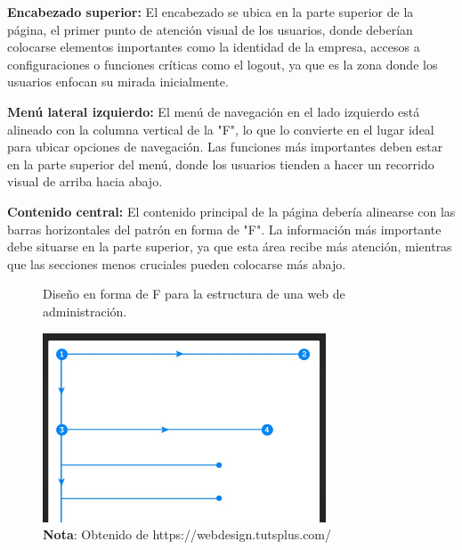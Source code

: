 		\textbf{Encabezado superior:} El encabezado se ubica en la parte superior de la página, el primer punto de atención visual de los usuarios, donde deberían colocarse elementos importantes como la identidad de la empresa, accesos a configuraciones o funciones críticas como el logout, ya que es la zona donde los usuarios enfocan su mirada inicialmente.
		
		\textbf{Menú lateral izquierdo:} El menú de navegación en el lado izquierdo está alineado con la columna vertical de la "F", lo que lo convierte en el lugar ideal para ubicar opciones de navegación. Las funciones más importantes deben estar en la parte superior del menú, donde los usuarios tienden a hacer un recorrido visual de arriba hacia abajo.
		
		\textbf{Contenido central:} El contenido principal de la página debería alinearse con las barras horizontales del patrón en forma de "F". La información más importante debe situarse en la parte superior, ya que esta área recibe más atención, mientras que las secciones menos cruciales pueden colocarse más abajo.
		
		\begin{figure}[h] %
			\caption[Diseño en forma de F]
			{\newline Diseño en forma de F para la estructura de una web de administración.} %
			\vspace{0.3cm}
			\centering
			\includegraphics[width=0.75\textwidth]{imagenes/figura2_5.jpg} %
			\vspace{0.3cm}
			\caption*{\textup{\textbf{Nota}: Obtenido de https://webdesign.tutsplus.com/}}
			\vspace{-0.8cm}
			\label{fig:figura2_5} %
		\end{figure}
		
